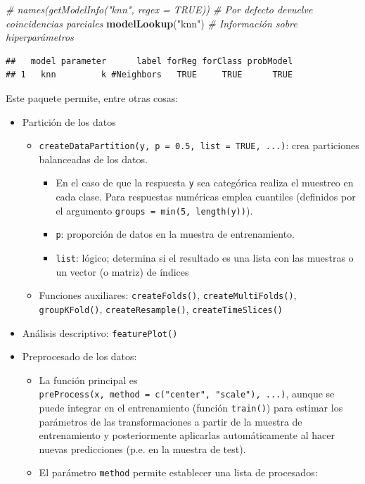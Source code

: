 \documentclass[]{book}
\newenvironment{Shaded}{\begin{snugshade}}{\end{snugshade}}
\newcommand{\KeywordTok}[1]{\textcolor[rgb]{0.13,0.29,0.53}{\textbf{#1}}}
\newcommand{\StringTok}[1]{\textcolor[rgb]{0.31,0.60,0.02}{#1}}
\newcommand{\CommentTok}[1]{\textcolor[rgb]{0.56,0.35,0.01}{\textit{#1}}}
\newcommand{\NormalTok}[1]{#1}
\theoremstyle{break}
\theoremstyle{definition}
\theoremstyle{definition}
\theoremstyle{definition}
\theoremstyle{remark}
\begin{document}
\begin{Shaded}
\begin{Highlighting}[]
\CommentTok{# names(getModelInfo("knn", regex = TRUE)) # Por defecto devuelve coincidencias parciales}
\KeywordTok{modelLookup}\NormalTok{(}\StringTok{"knn"}\NormalTok{)  }\CommentTok{# Información sobre hiperparámetros}
\end{Highlighting}
\end{Shaded}

\begin{verbatim}
##   model parameter      label forReg forClass probModel
## 1   knn         k #Neighbors   TRUE     TRUE      TRUE
\end{verbatim}

Este paquete permite, entre otras cosas:

\begin{itemize}
\item
  Partición de los datos

  \begin{itemize}
  \item
    \texttt{createDataPartition(y,\ p\ =\ 0.5,\ list\ =\ TRUE,\ ...)}:
    crea particiones balanceadas de los datos.

    \begin{itemize}
    \item
      En el caso de que la respuesta \texttt{y} sea categórica realiza
      el muestreo en cada clase. Para respuestas numéricas emplea
      cuantiles (definidos por el argumento
      \texttt{groups\ =\ min(5,\ length(y))}).
    \item
      \texttt{p}: proporción de datos en la muestra de entrenamiento.
    \item
      \texttt{list}: lógico; determina si el resultado es una lista con
      las muestras o un vector (o matriz) de índices
    \end{itemize}
  \item
    Funciones auxiliares: \texttt{createFolds()},
    \texttt{createMultiFolds()}, \texttt{groupKFold()},
    \texttt{createResample()}, \texttt{createTimeSlices()}
  \end{itemize}
\item
  Análisis descriptivo: \texttt{featurePlot()}
\item
  Preprocesado de los datos:

  \begin{itemize}
  \item
    La función principal es
    \texttt{preProcess(x,\ method\ =\ c("center",\ "scale"),\ ...)},
    aunque se puede integrar en el entrenamiento (función
    \texttt{train()}) para estimar los parámetros de las
    transformaciones a partir de la muestra de entrenamiento y
    posteriormente aplicarlas automáticamente al hacer nuevas
    predicciones (p.e. en la muestra de test).
  \item
    El parámetro \texttt{method} permite establecer una lista de
    procesados:


\end{itemize}
\end{itemize}
\end{document}

